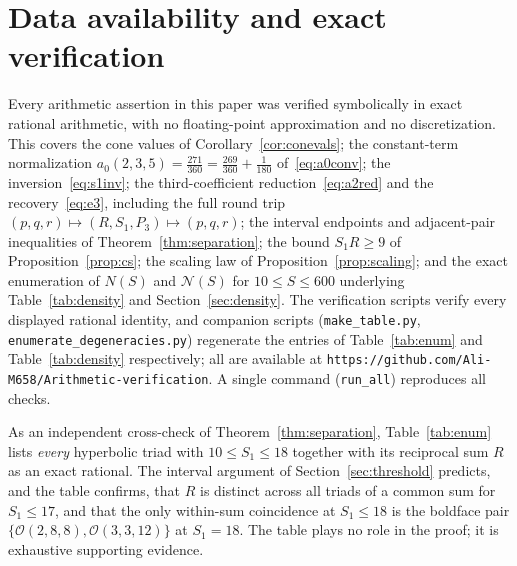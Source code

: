 \documentclass[12pt, letterpaper]{article}
\theoremstyle{definition}
\theoremstyle{plain}
\begin{document}
\appendix
\newpage
\section{Data availability and exact verification}
\label{sec:appendix}

Every arithmetic assertion in this paper was verified symbolically in exact rational arithmetic, with no floating-point approximation and no discretization. This covers the cone values of Corollary~\ref{cor:conevals}; the constant-term normalization $a_0(2,3,5)=\tfrac{271}{360}=\tfrac{269}{360}+\tfrac1{180}$ of~\eqref{eq:a0conv}; the inversion~\eqref{eq:s1inv}; the third-coefficient reduction~\eqref{eq:a2red} and the recovery~\eqref{eq:e3}, including the full round trip $(p,q,r)\mapsto(R,S_1,P_3)\mapsto(p,q,r)$; the interval endpoints and adjacent-pair inequalities of Theorem~\ref{thm:separation}; the bound $S_1R\ge9$ of Proposition~\ref{prop:cs}; the scaling law of Proposition~\ref{prop:scaling}; and the exact enumeration of $N(S)$ and $\mathcal N(S)$ for $10\le S\le600$ underlying Table~\ref{tab:density} and Section~\ref{sec:density}. The verification scripts verify every displayed rational identity, and companion scripts (\texttt{make\_table.py}, \texttt{enumerate\_degeneracies.py}) regenerate the entries of Table~\ref{tab:enum} and Table~\ref{tab:density} respectively; all are available at \texttt{https://github.com/Ali-M658/Arithmetic-verification}. A single command (\texttt{run\_all}) reproduces all checks.

As an independent cross-check of Theorem~\ref{thm:separation}, Table~\ref{tab:enum} lists \emph{every} hyperbolic triad with $10\le S_1\le18$ together with its reciprocal sum $R$ as an exact rational. The interval argument of Section~\ref{sec:threshold} predicts, and the table confirms, that $R$ is distinct across all triads of a common sum for $S_1\le17$, and that the only within-sum coincidence at $S_1\le18$ is the boldface pair $\{\mathcal{O}(2,8,8),\mathcal{O}(3,3,12)\}$ at $S_1=18$. The table plays no role in the proof; it is exhaustive supporting evidence.
\end{document}
